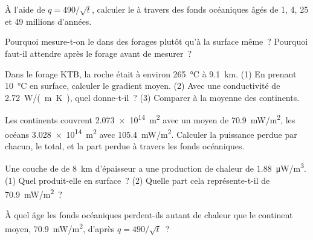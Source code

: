 \begin{exercise}[$\star$]\label{exo:g12:internal-heat:4}
À l'aide de $q = 490/\sqrt{t}$, calculer le  à travers
des fonds océaniques âgés de 1, 4, 25 et 49 millions d'années.
\end{exercise}

\begin{exercise}[$\star$]\label{exo:g12:internal-heat:5}
Pourquoi mesure-t-on le  dans des forages plutôt qu'à la
surface même~? Pourquoi faut-il attendre après le forage avant de mesurer~?
\end{exercise}

\begin{exercise}[$\star\star$]\label{exo:g12:internal-heat:6}
Dans le forage KTB, la roche était à environ \qty{265}{\celsius} à
\qty{9.1}{km}. (1) En prenant \qty{10}{\celsius} en surface, calculer le
gradient moyen. (2) Avec une conductivité de \qty{2.72}{W/(m.K)}, quel
 donne-t-il~? (3) Comparer à la moyenne des continents.
\end{exercise}

\begin{exercise}[$\star\star$]\label{exo:g12:internal-heat:7}
Les continents couvrent \qty{2.073e14}{m^2} avec un  moyen
de \qty{70.9}{mW/m^2}, les océans \qty{3.028e14}{m^2} avec
\qty{105.4}{mW/m^2}. Calculer la puissance perdue par chacun, le total, et
la part perdue à travers les fonds océaniques.
\end{exercise}

\begin{exercise}[$\star\star$]\label{exo:g12:internal-heat:8}
Une couche de  de \qty{8}{km} d'épaisseur a une production de
chaleur de \qty{1.88}{\micro W/m^3}. (1) Quel 
produit-elle en surface~? (2) Quelle part cela représente-t-il de
\qty{70.9}{mW/m^2}~?
\end{exercise}

\begin{exercise}[$\star\star$]\label{exo:g12:internal-heat:9}
À quel âge les fonds océaniques perdent-ils autant de chaleur que le
continent moyen, \qty{70.9}{mW/m^2}, d'après $q = 490/\sqrt{t}$~?
\end{exercise}

